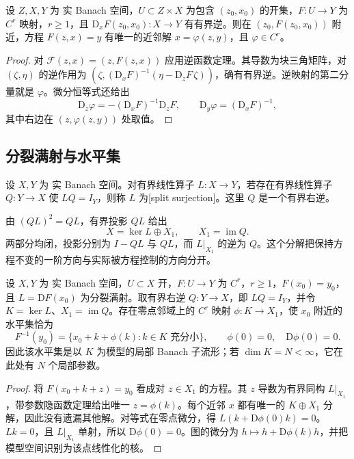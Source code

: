 \begin{corollary}[带参数的隐函数定理]\label{g3:cor:banach-implicit-parameters}
	设 \(Z,X,Y\) 为 实 Banach 空间，\(U\subset Z\times X\) 为包含 \((z_0,x_0)\) 的开集，\(F:U\to Y\) 为 \(C^r\) 映射，\(r\ge1\)，且 \(\mathrm D_xF(z_0,x_0):X\to Y\) 有有界逆。则在 \((z_0,F(z_0,x_0))\) 附近，方程 \(F(z,x)=y\) 有唯一的近邻解 \(x=\varphi(z,y)\)，且 \(\varphi\in C^r\)。
\end{corollary}
\begin{proof}
	对 \(\mathcal F(z,x)=(z,F(z,x))\) 应用逆函数定理。其导数为块三角矩阵，对 \((\zeta,\eta)\) 的逆作用为
	\((\zeta,(\mathrm D_xF)^{-1}(\eta-\mathrm D_zF\,\zeta))\)，确有有界逆。逆映射的第二分量就是 \(\varphi\)。微分恒等式还给出
	\[
		\mathrm D_z\varphi=-(\mathrm D_xF)^{-1}\mathrm D_zF,\qquad
		\mathrm D_y\varphi=(\mathrm D_xF)^{-1},
	\]
	其中右边在 \((z,\varphi(z,y))\) 处取值。
\end{proof}

\subsection{分裂满射与水平集}
\label{g3:subsec:1305:03}
\begin{definition}\label{g3:def:split-surjection}
	设 \(X,Y\) 为 实 Banach 空间。对有界线性算子 \(L:X\to Y\)，若存在有界线性算子 \(Q:Y\to X\) 使 \(LQ=I_Y\)，则称 \(L\) 为[split surjection]。这里 \(Q\) 是一个有界右逆。
\end{definition}
由 \((QL)^2=QL\)，有界投影 \(QL\) 给出
\[
	X=\ker L\oplus X_1,\qquad X_1=\operatorname{im}Q.
\]
两部分均闭，投影分别为 \(I-QL\) 与 \(QL\)，而 \(L|_{X_1}\) 的逆为 \(Q\)。这个分解把保持方程不变的一阶方向与实际被方程控制的方向分开。

\begin{theorem}\label{g3:thm:split-regular-level}
	设 \(X,Y\) 为 实 Banach 空间，\(U\subset X\) 开，\(F:U\to Y\) 为 \(C^r\)，\(r\ge1\)，\(F(x_0)=y_0\)，且 \(L=\mathrm DF(x_0)\) 为分裂满射。取有界右逆 \(Q:Y\to X\)，即 \(LQ=I_Y\)，并令 \(K=\ker L\)、\(X_1=\operatorname{im}Q\)。存在零点邻域上的 \(C^r\) 映射 \(\phi:K\to X_1\)，使 \(x_0\) 附近的水平集恰为
	\[
		F^{-1}(y_0)=\{x_0+k+\phi(k):k\in K\text{ 充分小}\},
		\qquad\phi(0)=0,\quad\mathrm D\phi(0)=0.
	\]
	因此该水平集是以 \(K\) 为模型的局部 Banach 子流形；若 \(\dim K=N<\infty\)，它在此处有 \(N\) 个局部参数。
\end{theorem}
\begin{proof}
	将 \(F(x_0+k+z)=y_0\) 看成对 \(z\in X_1\) 的方程。其 \(z\) 导数为有界同构 \(L|_{X_1}\)，带参数隐函数定理给出唯一 \(z=\phi(k)\)。每个近邻 \(x\) 都有唯一的 \(K\oplus X_1\) 分解，因此没有遗漏其他解。对等式在零点微分，得
	\(L(k+\mathrm D\phi(0)k)=0\)。\(Lk=0\)，且 \(L|_{X_1}\) 单射，所以 \(\mathrm D\phi(0)=0\)。图的微分为 \(h\mapsto h+\mathrm D\phi(k)h\)，并把模型空间识别为该点线性化的核。
\end{proof}

